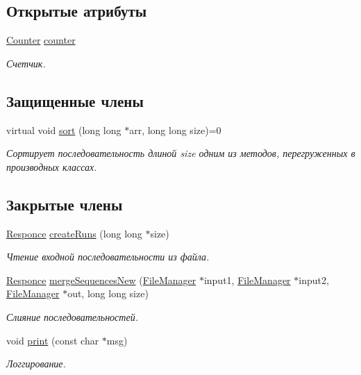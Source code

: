 \subsection*{Открытые атрибуты}
\begin{DoxyCompactItemize}
\item 
\hyperlink{class_counter}{Counter} \hyperlink{class_external_merge_sort_ac9cb039a5cda56e66aecbc17465dd237}{counter}
\begin{DoxyCompactList}\small\item\em Счетчик. \end{DoxyCompactList}\end{DoxyCompactItemize}
\subsection*{Защищенные члены}
\begin{DoxyCompactItemize}
\item 
virtual void \hyperlink{class_external_merge_sort_a7b777f22151fdd869624d8aa5a39a7bb}{sort} (long long $\ast$arr, long long size)=0
\begin{DoxyCompactList}\small\item\em Сортирует последовательность длиной size одним из методов, перегруженных в производных классах. \end{DoxyCompactList}\end{DoxyCompactItemize}
\subsection*{Закрытые члены}
\begin{DoxyCompactItemize}
\item 
\hyperlink{_structures_8h_a9864d6ef28dd6e38416afac4426b3491}{Responce} \hyperlink{class_external_merge_sort_aa3ec5ccebe04f02538ee42d0ffe7b75c}{create\+Runs} (long long $\ast$size)
\begin{DoxyCompactList}\small\item\em Чтение входной последовательности из файла. \end{DoxyCompactList}\item 
\hyperlink{_structures_8h_a9864d6ef28dd6e38416afac4426b3491}{Responce} \hyperlink{class_external_merge_sort_a8b4f951d9ee53818b8d3d4e84e2a1aa4}{merge\+Sequences\+New} (\hyperlink{class_file_manager}{File\+Manager} $\ast$input1, \hyperlink{class_file_manager}{File\+Manager} $\ast$input2, \hyperlink{class_file_manager}{File\+Manager} $\ast$out, long long size)
\begin{DoxyCompactList}\small\item\em Слияние последовательностей. \end{DoxyCompactList}\item 
void \hyperlink{class_external_merge_sort_a7a6b94fff35130ed6a498f9a31d0f863}{print} (const char $\ast$msg)
\begin{DoxyCompactList}\small\item\em Логгирование. \end{DoxyCompactList}\end{DoxyCompactItemize}
